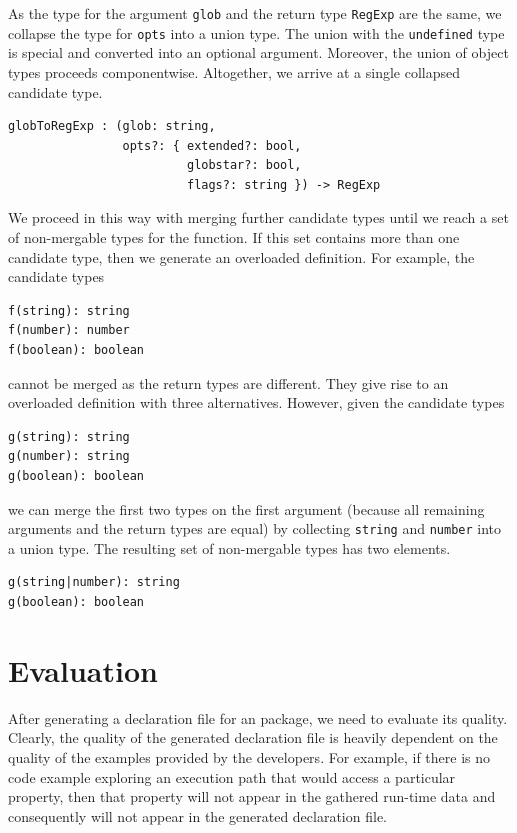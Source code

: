\documentclass[sigplan,screen]{acmart}
\begin{document}
As the type for the argument \lstinline{glob} and the return type
\lstinline{RegExp} are the same, we collapse the type for
\lstinline{opts} into a union type. The union with the
\lstinline{undefined} type is special and converted into an optional
argument. Moreover, the union of object types proceeds
componentwise. Altogether, we arrive at a single collapsed candidate
type.
\begin{verbatim}
globToRegExp : (glob: string, 
                opts?: { extended?: bool,
                         globstar?: bool,
                         flags?: string }) -> RegExp
\end{verbatim}
We proceed in this way with merging further candidate types until we
reach a set of non-mergable types for the function. If this set
contains more than one candidate type, then we generate an overloaded
definition. For example, the candidate types
\begin{verbatim}
f(string): string
f(number): number
f(boolean): boolean
\end{verbatim}
cannot be merged as the return types are different. They give rise to
an overloaded definition with three alternatives. However, given the candidate types
\begin{verbatim}
g(string): string
g(number): string
g(boolean): boolean
\end{verbatim}
we can merge the first two types on the first argument (because all
remaining arguments and the return types are equal) by collecting \lstinline{string} and
\lstinline{number} into a union type. The resulting set of non-mergable types
has two elements.
\begin{verbatim}
g(string|number): string
g(boolean): boolean
\end{verbatim}

\section{Evaluation}
\label{sec:dts-generate-evaluation}
After generating a declaration file for an \NPM{} package, we need to
evaluate its quality.
Clearly, the quality of the generated
declaration file is heavily dependent on the quality of the examples
provided by the developers. For
example, if there is no code example exploring an execution path that would
access a particular property, then that
property will not appear in the gathered run-time data and
consequently will not appear in the generated declaration file.
\end{document}
